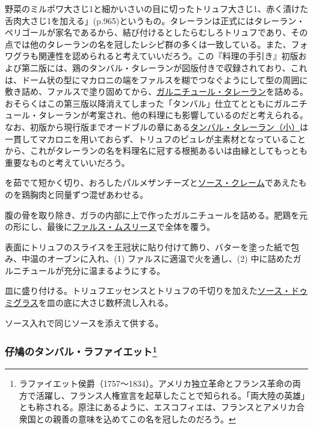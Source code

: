 {  \par

  野菜のミルポワ大さじ1と細かいさいの目に切ったトリュフ大さじ1、赤く漬けた舌肉大さじ1を加える」(p.965)というもの。タレーランは正式にはタレーラン・ペリゴールが家名であるから、結び付けるとしたらむしろトリュフであり、その点では他のタレーランの名を冠したレシピ群の多くは一致している。また、フォワグラも関連性を認められると考えていいだろう。この『料理の手引き』初版および第二版には、鶏のタンバル・タレーランが図版付きで収録されており、これは、ドーム状の型にマカロニの端をファルスを糊でつなぐようにして型の周囲に敷き詰め、ファルスで塗り固めてから、\protect\hyperlink{garniture-talleyrand}{ガルニチュール・タレーラン}を詰める。おそらくはこの第三版以降消えてしまった「タンバル」仕立てとともにガルニチュール・タレーランが考案され、他の料理にも影響しているのだと考えられる。なお、初版から現行版までオードブルの章にある\protect\hyperlink{timbales-talleyrand-petites}{タンバル・タレーラン（小）}は一貫してマカロニを用いておらず、トリュフのピュレが主素材となっていることから、これがタレーランの名を料理名に冠する根拠あるいは由縁としてもっとも重要なものと考えていいだろう。}を茹でて短かく切り、おろしたパルメザンチーズと\protect\hyperlink{sauce-a-la-creme}{ソース・クレーム}であえたものを鶏胸肉と同量ずつ混ぜあわせる。

腹の骨を取り除き、ガラの内部に上で作ったガルニチュールを詰める。肥鶏を元の形にし、最後に\protect\hyperlink{farce-c}{ファルス・ムスリーヌ}で全体を覆う。

表面にトリュフのスライスを王冠状に貼り付けて飾り、バターを塗った紙で包み、中温のオーブンに入れ、(1)
ファルスに適温で火を通し、(2)
中に詰めたガルニチュールが充分に温まるようにする。

皿に盛り付ける。トリュフエッセンスとトリュフの千切りを加えた\protect\hyperlink{sauce-demi-glace}{ソース・ドゥミグラス}を皿の底に大さじ数杯流し入れる。

ソース入れで同じソースを添えて供する。

\hypertarget{timbale-de-pigeonneaux-la-fayette}{%
\subsubsection[仔鳩のタンバル・ラファイエット]{\texorpdfstring{仔鳩のタンバル・ラファイエット\footnote{ラファイエット侯爵（1757〜1834）。アメリカ独立革命とフランス革命の両方で活躍し、フランス人権宣言を起草したことで知られる。「両大陸の英雄」とも称される。原注にあるように、エスコフィエは、フランスとアメリカ合衆国との親善の意味を込めてこの名を冠したのだろう。}}{仔鳩のタンバル・ラファイエット}}\label{timbale-de-pigeonneaux-la-fayette}}

